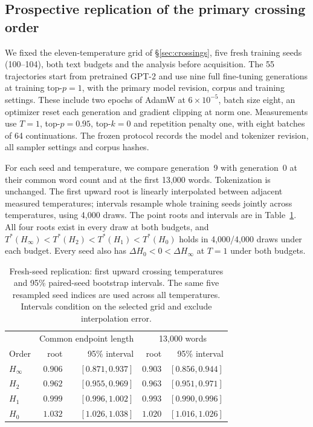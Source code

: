 \documentclass[10pt]{article}
\theoremstyle{plain}
\theoremstyle{definition}
\newcommand{\Htwo}{H_2}
\newcommand{\Hz}{H_0}
\newcommand{\Hinf}{H_\infty}
\begin{document}
\subsection{Prospective replication of the primary crossing order}

We fixed the eleven-temperature grid of \S\ref{sec:crossings}, five fresh training seeds
(100--104), both text budgets and the analysis before acquisition. The 55 trajectories
start from pretrained GPT-2 and use nine full fine-tuning generations at training top-$p=1$,
with the primary model revision, corpus and training settings. These include two epochs
of AdamW at $6\times10^{-5}$, batch size eight, an optimizer reset each generation and
gradient clipping at norm one. Measurements use $T=1$, top-$p=0.95$, top-$k=0$ and repetition
penalty one, with eight batches of 64 continuations. The frozen protocol records the model
and tokenizer revision, all sampler settings and corpus hashes.

For each seed and temperature, we compare generation~9 with generation~0 at their common
word count and at the first 13,000 words. Tokenization is unchanged. The first upward root
is linearly interpolated between adjacent measured temperatures; intervals resample whole
training seeds jointly across temperatures, using 4,000 draws. The point roots and intervals
are in Table~\ref{tab:freshcrossings}. All four roots exist in every draw at both budgets, and
$T^*(\Hinf)<T^*(\Htwo)<T^*(H_1)<T^*(\Hz)$ holds in 4,000/4,000 draws under each budget.
Every seed also has $\Delta\Hz<0<\Delta\Hinf$ at $T=1$ under both budgets.

\begin{table}[ht]
\centering\small
\caption{Fresh-seed replication: first upward crossing temperatures and 95\% paired-seed
bootstrap intervals. The same five resampled seed indices are used across all temperatures.
Intervals condition on the selected grid and exclude interpolation error.}
\label{tab:freshcrossings}
\begin{tabular}{lrrrr}
\toprule
& \multicolumn{2}{c}{Common endpoint length} & \multicolumn{2}{c}{13,000 words} \\
Order & root & 95\% interval & root & 95\% interval \\
\midrule
$\Hinf$ & $0.906$ & $[0.871,0.937]$ & $0.903$ & $[0.856,0.944]$ \\
$\Htwo$ & $0.962$ & $[0.955,0.969]$ & $0.963$ & $[0.951,0.971]$ \\
$H_1$ & $0.999$ & $[0.996,1.002]$ & $0.993$ & $[0.990,0.996]$ \\
$\Hz$ & $1.032$ & $[1.026,1.038]$ & $1.020$ & $[1.016,1.026]$ \\
\bottomrule
\end{tabular}
\end{table}
\end{document}
